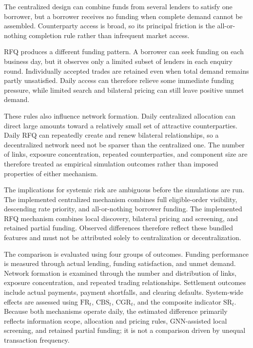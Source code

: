 The centralized design can combine funds from several lenders to satisfy
one borrower, but a borrower receives no funding when complete demand
cannot be assembled. Counterparty access is broad, so its principal
friction is the all-or-nothing completion rule rather than infrequent
market access.

RFQ produces a different funding pattern. A borrower can seek funding on
each business day, but it observes only a limited subset of lenders in
each enquiry round. Individually accepted trades are retained even when
total demand remains partly unsatisfied. Daily access can therefore
relieve some immediate funding pressure, while limited search and
bilateral pricing can still leave positive unmet demand.

These rules also influence network formation. Daily centralized allocation
can direct large amounts toward a relatively small set of attractive
counterparties. Daily RFQ can repeatedly create and renew bilateral
relationships, so a decentralized network need not be sparser than the
centralized one. The number of links, exposure concentration, repeated
counterparties, and component size are therefore treated as empirical
simulation outcomes rather than imposed properties of either mechanism.

The implications for systemic risk are ambiguous before the simulations
are run. The implemented centralized mechanism combines full eligible-order
visibility, descending rate priority, and all-or-nothing borrower funding.
The implemented RFQ mechanism combines local discovery, bilateral pricing
and screening, and retained partial funding. Observed differences therefore
reflect these bundled features and must not be attributed solely to
centralization or decentralization.

The comparison is evaluated using four groups of outcomes. Funding
performance is measured through actual lending, funding satisfaction,
and unmet demand. Network formation is examined through the number and
distribution of links, exposure concentration, and repeated trading
relationships. Settlement outcomes include actual payments, payment
shortfalls, and clearing defaults. System-wide effects are assessed
using \(\mathrm{FR}_t\), \(\mathrm{CBS}_t\), \(\mathrm{CGR}_t\), and the composite
indicator \(\mathrm{SR}_t\). Because both mechanisms operate daily, the
estimated difference primarily reflects information scope, allocation and
pricing rules, GNN-assisted local screening, and retained partial funding;
it is not a comparison driven by unequal transaction frequency.

